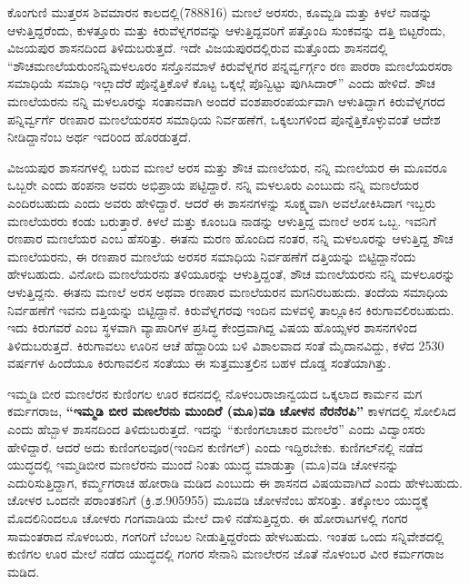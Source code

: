 ಕೊಂಗುಣಿ ಮುತ್ತರಸ ಶಿವಮಾರನ ಕಾಲದಲ್ಲಿ(788\enginline{-}816) ಮಣಲೆ ಅರಸರು, ಕೂಮ್ಬಡಿ ಮತ್ತು ಕಿಳಲೆ ನಾಡನ್ನು ಆಳುತ್ತಿದ್ದರೆಂದು, ಕುಳತ್ತೂರು ಮತ್ತು ಕಿರುವೆಳ್ನಗರವನ್ನು ಆಳುತ್ತಿದ್ದವರಿಗೆ ಪತ್ತೊಂದಿ ಸುಂಕವನ್ನು ದತ್ತಿ ಬಿಟ್ಟರೆಂದು, ವಿಜಯಪುರ ಶಾಸನದಿಂದ ತಿಳಿದುಬರುತ್ತದೆ. ಇದೇ ವಿಜಯಪುರದಲ್ಲಿರುವ ಮತ್ತೊಂದು ಶಾಸನದಲ್ಲಿ “ಶೌಚಮಣಲೆಯರುಂ\break ನನ್ನಿಮಳಲೂರಂ ಸನ್ತೊನಮಾಳೆ ಕಿರುವೆಳ್ನಗರ ಪನ್ನರ್ವ್ವರ್ಗ್ಗಂ ರಣ ಪಾರರಾ ಮಣಲೆಯರಸರಾ ಸಮಾಧಿಯೆ ಸಮಾಧಿ ಇಲ್ಲಾದೆರೆ ಪೊನ್ನೆತ್ತಿಕೊಳೆ ಕೊಟ್ಟ ಒಕ್ಕಲ್ಗೆ ಪೊನ್ವಿಟ್ಟು ಪುಗಿಸಿದಾರ್​” ಎಂದು ಹೇಳಿದೆ. ಶೌಚ ಮಣಲೆಯರನು ನನ್ನಿ ಮಳಲೂರನ್ನು ಸಂತಾನವಾಗಿ ಅಂದರೆ ವಂಶಪಾರಂಪರ್ಯವಾಗಿ ಆಳುತಿದ್ದಾಗ ಕಿರುವೆಳ್ನಗರದ ಪನ್ನಿರ್ವ್ವರ್ಗೆ ರಣಪಾರ ಮಣಲೆಯರಸರ ಸಮಾಧಿಯ ನಿರ್ವಹಣೆಗೆ, ಒಕ್ಕಲುಗಳಿಂದ ಪೊನ್ನೆತ್ತಿಕೊಳ್ಳುವಂತೆ ಆದೇಶ ನೀಡಿದ್ದಾನೆಂಬ ಅರ್ಥ ಇದರಿಂದ ಹೊರಡುತ್ತದೆ.

ವಿಜಯಪುರ ಶಾಸನಗಳಲ್ಲಿ ಬರುವ ಮಣಲೆ ಅರಸ ಮತ್ತು ಶೌಚ ಮಣಲೆಯರ, ನನ್ನಿ ಮಣಲೆಯರ ಈ ಮೂವರೂ ಒಬ್ಬರೇ ಎಂದು ಹಂಪನಾ ಅವರು ಅಭಿಪ್ರಾಯ ಪಟ್ಟಿದ್ದಾರೆ. ನನ್ನಿ ಮಳಲೂರು ಎಂಬುದು ನನ್ನಿ ಮಣಲೆಯರ ಎಂದಿರಬಹುದು ಎಂದು ಅವರು ಹೇಳಿದ್ದಾರೆ. ಆದರೆ ಈ ಶಾಸನಗಳನ್ನು ಸೂಕ್ಷ್ಮವಾಗಿ ಅವಲೋಕಿಸಿದಾಗ ಇಬ್ಬರು ಮಣಲೆಯರರು ಕಂಡು ಬರುತ್ತಾರೆ. ಕಿಳಲೆ ಮತ್ತು ಕೂಂಬಡಿ ನಾಡನ್ನು ಆಳುತ್ತಿದ್ದ ಮಣಲೆ ಅರಸ ಒಬ್ಬ. ಇವನಿಗೆ ರಣಪಾರ ಮಣಲೆಯರ ಎಂಬ ಹೆಸರಿತ್ತು. ಈತನು ಮರಣ ಹೊಂದಿದ ನಂತರ, ನನ್ನಿ ಮಳಲೂರನ್ನು ಆಳುತ್ತಿದ್ದ ಶೌಚ ಮಣಲೆಯರನು, ಈ ರಣಪಾರ ಮಣಲೆಯ ಅರಸರ ಸಮಾಧಿಯ ನಿರ್ವಹಣೆಗೆ ದತ್ತಿಯನ್ನು ಬಿಟ್ಟಿದ್ದಾನೆಂದು ಹೇಳಬಹುದು. ವಿನೋದಿ ಮಣಲೆಯರನು ತಳಿಯೂರನ್ನು ಆಳುತ್ತಿದ್ದಂತೆ, ಶೌಚ ಮಣಲೆಯರನು ನನ್ನಿ ಮಳಲೂರನ್ನು ಆಳುತ್ತಿದ್ದನು. ಈತನು ಮಣಲೆ ಅರಸ ಅಥವಾ ರಣಪಾರ ಮಣಲೆಯರನ ಮಗನಿರಬಹುದು. ತಂದೆಯ ಸಮಾಧಿಯ ನಿರ್ವಹಣೆಗೆ ಇವನು ದತ್ತಿಯನ್ನು ಬಿಟ್ಟಿದ್ದಾನೆ. ಕಿರುವೆಳ್ನಗರವು ಇಂದಿನ ಮಳವಳ್ಳಿ ತಾಲ್ಲೂಕಿನ ಕಿರುಗಾವಲಿರಬಹುದು. ಇದು ಕಿರುಗವರೆ ಎಂಬ ಸ್ಥಳವಾಗಿ ವ್ಯಾಪಾರಿಗಳ ಪ್ರಸಿದ್ಧ ಕೇಂದ್ರವಾಗಿದ್ದ ವಿಷಯ ಹೊಯ್ಸಳರ ಶಾಸನಗಳಿಂದ ತಿಳಿದುಬರುತ್ತದೆ. ಕಿರುಗಾವಲು ಊರಿನ ಆಚೆ ಹೆದ್ದಾರಿಯ ಬಳಿ ವಿಶಾಲವಾದ ಸಂತೆ ಮೈದಾನವಿದ್ದು, ಕಳೆದ 25\enginline{-}30 ವರ್ಷಗಳ ಹಿಂದೆಯೂ ಕಿರುಗಾವಲಿನ ಸಂತೆಯು ಈ ಸುತ್ತಮುತ್ತಲಿನ ಬಹಳ ದೊಡ್ಡ ಸಂತೆಯಾಗಿತ್ತು.

ಇಮ್ಮಡಿ ಬೀರ ಮಣಲೆರನ ಕುಣಿಂಗಲ ಊರ ಕದನದಲ್ಲಿ ನೊಳಂಬರಾಜಾನ್ವಯದ ಒಕ್ಕಲಾದ ಕಾರ್ಮನ ಮಗ ಕರ್ಮಗರಾಜ, \textbf{“ಇಮ್ಮಡಿ ಬೀರ ಮಣಲೆರನು ಮುಂದಿರೆ (ಮೂ)ವಡಿ ಚೋಳನ ನೆರನೆರಪಿ”} ಕಾಳಗದಲ್ಲಿ ಸೋಲಿಸಿದ ಎಂದು ಹೆಬ್ಬಾಳ ಶಾಸನದಿಂದ ತಿಳಿದುಬರುತ್ತದೆ. ಇದನ್ನು “ಕುಣಿಂಗಲಾಚಾರ ಮಣಲೆರ” ಎಂದು ವಿದ್ವಾಂಸರು ಹೇಳಿದ್ದಾರೆ. ಆದರೆ ಅದು ಕುಣಿಂಗಲವೂರ(ಇಂದಿನ ಕುಣಿಗಲ್​) ಎಂದು ಇದ್ದಿರಬೇಕು. ಕುಣಿಗಲ್​ನಲ್ಲಿ ನಡೆದ ಯುದ್ಧದಲ್ಲಿ ಇಮ್ಮಡಿಬೀರ ಮಣಲೆರನು ಮುಂದೆ ನಿಂತು ಯುದ್ಧ ಮಾಡುತ್ತಾ (ಮೂ)ವಡಿ ಚೋಳನನ್ನು ಎದುರಿಸುತ್ತಿದ್ದಾಗ, ಕರ್ಮ್ಮಗರಾಚ ಹೋರಾಡಿ ಮಡಿದ ಎಂಬುದು ಈ ಶಾಸನದ ವಿಷಯವಾಗಿದೆ ಎಂದು ಹೇಳಬಹುದು. ಚೋಳರ ಒಂದನೇ ಪರಾಂತಕನಿಗೆ (ಕ್ರಿ.ಶ.905\enginline{-}955) ಮೂವಡಿ ಚೋಳನೆಂಬ ಹೆಸರಿತ್ತು. ತಕ್ಕೋಲಂ ಯುದ್ಧಕ್ಕೆ ಮೊದಲಿನಿಂದಲೂ ಚೋಳರು ಗಂಗವಾಡಿಯ ಮೇಲೆ ದಾಳಿ ನಡೆಸುತ್ತಿದ್ದರು. ಈ ಹೋರಾಟಗಳಲ್ಲಿ ಗಂಗರ ಸಾಮಂತರಾದ ನೊಳಂಬರು, ಗಂಗರಿಗೆ ಬೆಂಬಲ ನೀಡುತ್ತಿದ್ದರೆಂದು ಹೇಳಬಹುದು. ಇಂತಹ ಒಂದು ಸನ್ನಿವೇಶದಲ್ಲಿ ಕುಣಿಗಲ ಊರ ಮೇಲೆ ನಡೆದ ಯುದ್ಧದಲ್ಲಿ ಗಂಗರ ಸೇನಾನಿ ಮಣಲೇರನ ಜೊತೆ ನೊಳಂಬರ ವೀರ ಕರ್ಮಗರಾಜ ಮಡಿದ.

